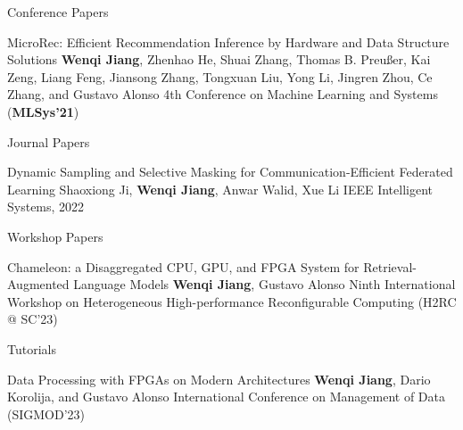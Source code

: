 \begin{rSection}{Conference Papers}
\begin{enumerate}[label={[\arabic*]}]
\item 
\begin{Pub}{MicroRec: Efficient Recommendation Inference by Hardware and Data Structure Solutions}
{\textbf{Wenqi Jiang}, Zhenhao He, Shuai Zhang, Thomas B. Preußer, Kai Zeng, Liang Feng, Jiansong Zhang, Tongxuan Liu, Yong Li, Jingren Zhou, Ce Zhang, and Gustavo Alonso}
{4th Conference on Machine Learning and Systems (\textbf{MLSys'21})}
\end{Pub}\end{enumerate}
\end{rSection}



\begin{rSection}{Journal Papers}
\begin{enumerate}[label={[\arabic*]}]

\item 
\begin{Pub}{Dynamic Sampling and Selective Masking for Communication-Efficient Federated Learning}
{Shaoxiong Ji, \textbf{Wenqi Jiang}, Anwar Walid, Xue Li}
{IEEE Intelligent Systems, 2022 }
\end{Pub}\end{enumerate}
\end{rSection}



\begin{rSection}{Workshop Papers}
\begin{enumerate}[label={[\arabic*]}]

\item 
\begin{Pub}{Chameleon: a Disaggregated CPU, GPU, and FPGA System for Retrieval-Augmented Language Models}
{\textbf{Wenqi Jiang}, Gustavo Alonso}
{Ninth International Workshop on Heterogeneous High-performance Reconfigurable Computing (H2RC @ SC'23)}
\end{Pub}\end{enumerate}
\end{rSection}



\begin{rSection}{Tutorials}

\begin{enumerate}[label={[\arabic*]}]

\item 
\begin{Pub}{Data Processing with FPGAs on Modern Architectures}
{\textbf{Wenqi Jiang}, Dario Korolija, and Gustavo Alonso}
{International Conference on Management of Data (SIGMOD'23)}
\end{Pub}\end{enumerate}
\end{rSection}

